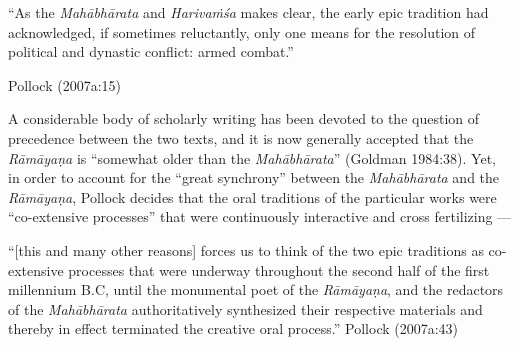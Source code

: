 \begin{myquote}
“As the {\sl Mahābhārata} and {\sl Harivaṁśa} makes clear, the early epic tradition had acknowledged, if sometimes reluctantly, only one means for the resolution of political and dynastic conflict: armed combat.”

\hfill Pollock (2007a:15)
\end{myquote}

A considerable body of scholarly writing has been devoted to the question of precedence between the two texts, and it is now generally accepted that the {\sl Rāmāyaṇa} is “somewhat older than the {\sl Mahābhārata}” (Goldman 1984:38). Yet, in order to account for the “great synchrony” between the {\sl Mahābhārata} and the {\sl Rāmāyaṇa}, Pollock decides that the oral traditions of the particular works were “co-extensive processes” that were continuously interactive and cross fertilizing ---

\begin{myquote}
“[this and many other reasons] forces us to think of the two epic traditions as co-extensive processes that were underway throughout the second half of the first millennium B.C, until the monumental poet of the {\sl Rāmāyaṇa}, and the redactors of the {\sl Mahābhārata} authoritatively synthesized their respective materials and thereby in effect terminated the creative oral process.”
\hfill Pollock (2007a:43)
\end{myquote}

